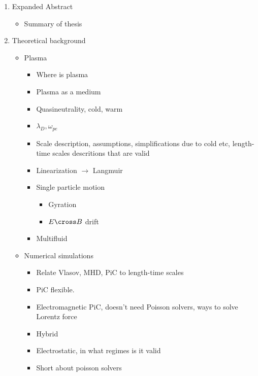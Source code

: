 \begin{enumerate}
    \item Expanded Abstract
        \begin{itemize}
            \item Summary of thesis
        \end{itemize}
    \item Theoretical background
        \begin{itemize}
            \item Plasma
            \begin{itemize}
                \item Where is plasma
                \item Plasma as a medium
                \item Quasineutrality, cold, warm
                \item \(\lambda_D, \omega_{pe}\)
                \item Scale description, assumptions, simplifications due to cold etc, length-time scales descritions that are valid
                \item Linearization \(\rightarrow\) Langmuir
                \item Single particle motion
                    \begin{itemize}
                        \item Gyration
                        \item \(E\cross B\) drift
                    \end{itemize}
                \item Multifluid
            \end{itemize}
            \item Numerical simulations
                \begin{itemize}
                    \item Relate Vlasov, MHD, PiC to length-time scales
                    \item PiC flexible.
                    \item Electromagnetic PiC, doesn't need Poisson solvers, ways to solve Lorentz force
                    \item Hybrid
                    \item Electrostatic, in what regimes is it valid
                    \item Short about poisson solvers
                \end{itemize}
        \end{itemize}

\end{enumerate}
